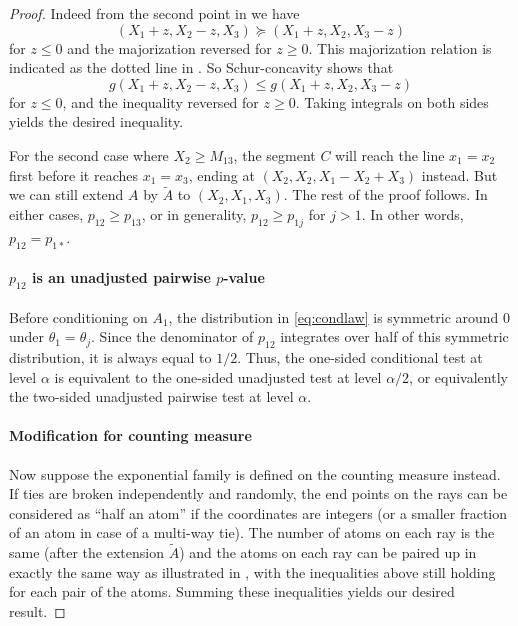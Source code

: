 \documentclass[aos, authoryear]{imsart}
\theoremstyle{definition}
\theoremstyle{custom}
\begin{document}
\begin{proof}
Indeed from the second point in  we have
\[\left(X_1 + z, X_2 - z, X_3\right) \succeq \left(X_1 + z, X_2, X_3 - z\right)\]
for $z \le 0$ and the majorization reversed for $z \ge 0$. This majorization relation is indicated as the dotted line in . So Schur-concavity shows that
\[g\left(X_1 + z, X_2 - z, X_3\right) \le g\left(X_1 + z, X_2, X_3 - z\right)\]
for $z \le 0$, and the inequality reversed for $z \ge 0$. Taking integrals on both sides yields the desired inequality.

For the second case where $X_2 \ge M_{13}$, the segment $C$ will reach the line $x_1 = x_2$ first before it reaches $x_1 = x_3$, ending at $\left(X_2, X_2, X_1 - X_2 + X_3\right)$ instead. But we can still extend $A$ by $\tilde{A}$ to $\left(X_2, X_1, X_3\right)$. The rest of the proof follows. In either cases, $p_{12} \ge p_{13}$, or in generality, $p_{12} \ge p_{1j}$ for $j > 1$. In other words, $p_{12} = p_{1*}$.

\paragraph{$p_{12}$ is an unadjusted pairwise $p$-value}

Before conditioning on $A_1$, the distribution in \eqref{eq:condlaw} is symmetric around $0$ under $\theta_1=\theta_j$. Since the denominator of $p_{12}$ integrates over half of this symmetric distribution, it is always equal to $1/2$. Thus, the one-sided conditional test at level $\alpha$ is equivalent to the one-sided unadjusted test at level $\alpha/2$, or equivalently the two-sided unadjusted pairwise test at level $\alpha$.

\paragraph{Modification for counting measure}

Now suppose the exponential family is defined on the counting measure instead. If ties are broken independently and randomly, the end points on the rays can be considered as ``half an atom'' if the coordinates are integers (or a smaller fraction of an atom in case of a multi-way tie). The number of atoms on each ray is the same (after the extension $\tilde{A}$) and the atoms on each ray can be paired up in exactly the same way as illustrated in , with the inequalities above still holding for each pair of the atoms. Summing these inequalities yields our desired result.
\end{proof}
\end{document}
